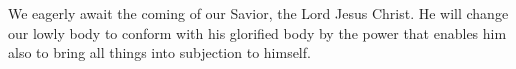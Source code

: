 
\lettrine{W}{}e eagerly await the coming of our Savior, the Lord Jesus Christ. He will change our lowly body to conform with his glorified body by the power that enables him also to bring all things into subjection to himself.